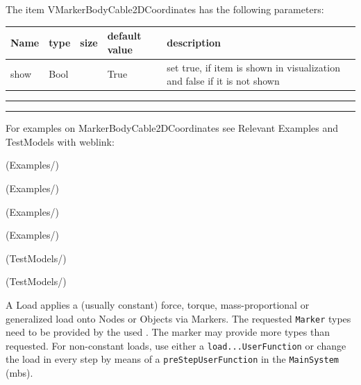\noindent The item VMarkerBodyCable2DCoordinates has the following parameters:
\begin{center}
  \footnotesize
  \begin{longtable}{| p{4.5cm} | p{2.5cm} | p{0.5cm} | p{2.5cm} | p{6cm} |}
    \hline
    \bf Name & \bf type & \bf size & \bf default value & \bf description \\ \hline
    show &     Bool &      &     True &     set true, if item is shown in visualization and false if it is not shown\\ \hline
\end{longtable}
\end{center}
\par\noindent\rule{\textwidth}{0.4pt}
\label{description_MarkerBodyCable2DCoordinates}
\vspace{6pt}\par\noindent\rule{\textwidth}{0.4pt}
%
\noindent For examples on MarkerBodyCable2DCoordinates see Relevant Examples and TestModels with weblink:
\bi
\item {} (Examples/)
\item {} (Examples/)
\item {} (Examples/)
\item {} (Examples/)
\item {} (TestModels/)
\item {} (TestModels/)

\ei

%

\newpage
A Load applies a (usually constant) force, torque, mass-proportional or generalized load onto Nodes or Objects via Markers. The requested \texttt{Marker} types need to be provided by the used . The marker may provide more types than requested. For non-constant loads, use either a \texttt{load...UserFunction} or change the load in every step by means of a \texttt{preStepUserFunction} in the \texttt{MainSystem} (mbs).

